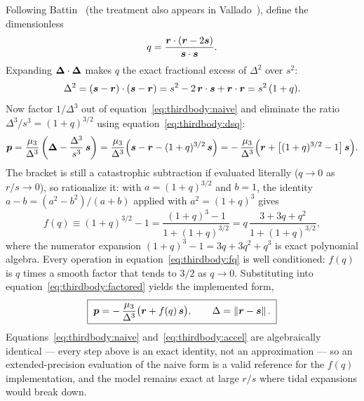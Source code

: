Following Battin~\cite{battin1999} (the treatment also appears in
Vallado~\cite{vallado2013}), define the dimensionless
\begin{equation}
  q = \frac{\bm{r} \cdot (\bm{r} - 2\bm{s})}{\bm{s} \cdot \bm{s}}.
  \label{eq:thirdbody:q}
\end{equation}
Expanding $\bm{\Delta} \cdot \bm{\Delta}$ makes $q$ the exact fractional
excess of $\Delta^{2}$ over $s^{2}$:
\begin{equation}
  \Delta^{2} = (\bm{s} - \bm{r}) \cdot (\bm{s} - \bm{r})
             = s^{2} - 2\,\bm{r}\cdot\bm{s} + \bm{r}\cdot\bm{r}
             = s^{2}\,(1 + q).
  \label{eq:thirdbody:dsq}
\end{equation}
Now factor $1/\Delta^{3}$ out of equation~\eqref{eq:thirdbody:naive} and
eliminate the ratio $\Delta^{3}/s^{3} = (1+q)^{3/2}$ using
equation~\eqref{eq:thirdbody:dsq}:
\begin{equation}
  \bm{p}
  = \frac{\mu_3}{\Delta^{3}}
    \left( \bm{\Delta} - \frac{\Delta^{3}}{s^{3}}\,\bm{s} \right)
  = \frac{\mu_3}{\Delta^{3}}
    \Bigl( \bm{s} - \bm{r} - (1+q)^{3/2}\,\bm{s} \Bigr)
  = -\,\frac{\mu_3}{\Delta^{3}}
    \Bigl( \bm{r} + \bigl[(1+q)^{3/2} - 1\bigr]\,\bm{s} \Bigr).
  \label{eq:thirdbody:factored}
\end{equation}
The bracket is still a catastrophic subtraction if evaluated literally
($q \to 0$ as $r/s \to 0$), so rationalize it: with $a = (1+q)^{3/2}$ and
$b = 1$, the identity $a - b = (a^{2} - b^{2})/(a + b)$ applied with
$a^{2} = (1+q)^{3}$ gives
\begin{equation}
  f(q) \equiv (1+q)^{3/2} - 1
       = \frac{(1+q)^{3} - 1}{1 + (1+q)^{3/2}}
       = q\,\frac{3 + 3q + q^{2}}{1 + (1+q)^{3/2}},
  \label{eq:thirdbody:fq}
\end{equation}
where the numerator expansion $(1+q)^{3} - 1 = 3q + 3q^{2} + q^{3}$ is
exact polynomial algebra. Every operation in
equation~\eqref{eq:thirdbody:fq} is well conditioned: $f(q)$ is $q$ times
a smooth factor that tends to $3/2$ as $q \to 0$. Substituting into
equation~\eqref{eq:thirdbody:factored} yields the implemented form,
\begin{equation}
  \boxed{\;
  \bm{p} = -\,\frac{\mu_3}{\Delta^{3}}
           \bigl( \bm{r} + f(q)\,\bm{s} \bigr),
  \qquad
  \Delta = \left\lVert \bm{r} - \bm{s} \right\rVert .
  \;}
  \label{eq:thirdbody:accel}
\end{equation}
Equations~\eqref{eq:thirdbody:naive} and~\eqref{eq:thirdbody:accel} are
algebraically identical --- every step above is an exact identity, not an
approximation --- so an extended-precision evaluation of the naive form
is a valid reference for the $f(q)$ implementation, and the model remains
exact at large $r/s$ where tidal expansions would break down.

